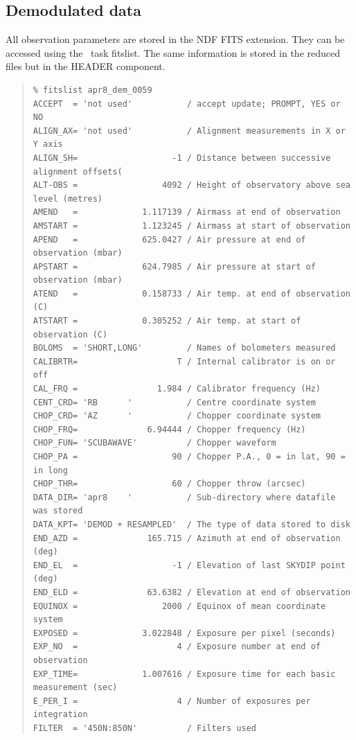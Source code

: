 \documentclass[twoside,11pt]{article}
\newcommand{\Kappa}{\xref{{\sc{Kappa}}}{sun95}{}}
\newcommand{\task}[1]{{\sf #1}}
\newcommand{\fitslist}{\xref{\task{fitslist}}{sun95}{FITSLIST}}
\newenvironment{myquote}{\begin{quote}\begin{small}}{\end{small}\end{quote}}
\newcommand{\xref}[3]{#1}
\renewcommand{\_}{\texttt{\symbol{95}}}
\begin{document}
\subsection{Demodulated data}

All observation parameters are stored in the NDF FITS extension. They can be
accessed using the \Kappa\ task \fitslist. The same information is
stored in the reduced files but in the HEADER component.

\begin{myquote}
\begin{verbatim}
% fitslist apr8_dem_0059
ACCEPT  = 'not used'           / accept update; PROMPT, YES or NO
ALIGN_AX= 'not used'           / Alignment measurements in X or Y axis
ALIGN_SH=                   -1 / Distance between successive alignment offsets(
ALT-OBS =                 4092 / Height of observatory above sea level (metres)
AMEND   =             1.117139 / Airmass at end of observation
AMSTART =             1.123245 / Airmass at start of observation
APEND   =             625.0427 / Air pressure at end of observation (mbar)
APSTART =             624.7985 / Air pressure at start of observation (mbar)
ATEND   =             0.158733 / Air temp. at end of observation (C)
ATSTART =             0.305252 / Air temp. at start of observation (C)
BOLOMS  = 'SHORT,LONG'         / Names of bolometers measured
CALIBRTR=                    T / Internal calibrator is on or off
CAL_FRQ =                1.984 / Calibrator frequency (Hz)
CENT_CRD= 'RB      '           / Centre coordinate system
CHOP_CRD= 'AZ      '           / Chopper coordinate system
CHOP_FRQ=              6.94444 / Chopper frequency (Hz)
CHOP_FUN= 'SCUBAWAVE'          / Chopper waveform
CHOP_PA =                   90 / Chopper P.A., 0 = in lat, 90 = in long
CHOP_THR=                   60 / Chopper throw (arcsec)
DATA_DIR= 'apr8    '           / Sub-directory where datafile was stored
DATA_KPT= 'DEMOD + RESAMPLED'  / The type of data stored to disk
END_AZD =              165.715 / Azimuth at end of observation (deg)
END_EL  =                   -1 / Elevation of last SKYDIP point (deg)
END_ELD =              63.6382 / Elevation at end of observation
EQUINOX =                 2000 / Equinox of mean coordinate system
EXPOSED =             3.022848 / Exposure per pixel (seconds)
EXP_NO  =                    4 / Exposure number at end of observation
EXP_TIME=             1.007616 / Exposure time for each basic measurement (sec)
E_PER_I =                    4 / Number of exposures per integration
FILTER  = '450N:850N'          / Filters used

\end{verbatim}
\end{myquote}
\end{document}
